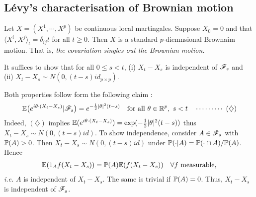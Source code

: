 \documentclass[12pt,a4paper]{article}
\newenvironment{proof}
{\begin{changemargin}{0.5cm}{0.5cm} 
	}%
	{\end{changemargin}
}
\newenvironment{p}
{\begin{proof} 
	}%
	{\end{proof}
}
\begin{document}
\subsection{L\'evy's characterisation of Brownian motion}

\thm Let $X = (X^1, \cdots, X^p)$ be continuous local martingales. Suppose $X_0 = 0$ and that $\langle X^i, X^j \rangle_t = \delta_{ij} t$ for all $t\geq 0$. Then $X$ is a standard $p$-diemnsional Brownaim motion. That is, \emph{the covariation singles out the Brownian motion.}
\begin{p}
\pf It suffices to show that for all $0\leq s <t$, (i) $X_t - X_s$ is independent of $\mathscr{F}_s$ and (ii) $X_t - X_s \sim N(0, (t-s)id_{p \times p})$.

\quad Both properties follow form the following claim :
\begin{align*}
\mathbb{E} \big(e^{i\theta \cdot (X_t - X_s)} | \mathscr{F}_s \big) = e^{-\frac{1}{2} |\theta|^2 (t-s)} \quad \text{for all } \theta\in \mathbb{R}^p, \,\, s< t \quad \cdots\cdots\cdots\,\,(\diamondsuit)
\end{align*}
Indeed, $(\diamondsuit)$ implies $\mathbb{E} (e^{i\theta \cdot (X_t - X_s)}) = \exp (- \frac{1}{2} |\theta|^2 (t-s))$ thus $X_t - X_s \sim N(0, (t-s)id)$. To show independence, consider $A\in \mathscr{F}_s$ with $\mathbb{P} (A) > 0$. Then $X_t - X_s \sim N (0, (t-s)id)$ under $\mathbb{P} (\cdot |A) = \mathbb{P}(\cdot \cap A) / \mathbb{P}(A)$. Hence
\begin{align*}
\mathbb{E} (1_A f(X_t - X_s)) = \mathbb{P}(A) \mathbb{E}(f(X_t - X_s))\quad \forall f \text{ measurable},
\end{align*}
\textit{i.e.} $A$ is independent of $X_t - X_s$. The same is trivial if $\mathbb{P}(A) =0$. Thus, $X_t - X_s$ is independent of $\mathscr{F}_s$.
\s


\end{p}
\end{document}
